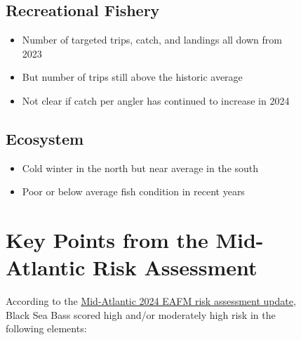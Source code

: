 \documentclass[
  10pt,
  letterpaper,
  DIV=11,
  numbers=noendperiod]{scrartcl}
\providecommand{\tightlist}{%
  \setlength{\itemsep}{0pt}\setlength{\parskip}{0pt}}\usepackage{longtable,booktabs,array}
\begin{document}
\begin{figure}
\begin{minipage}[t]{0.57\linewidth}
{\subsection{Recreational Fishery}

\begin{itemize}
\tightlist
\item
  Number of targeted trips, catch, and landings all down from 2023
\item
  But number of trips still above the historic average
\item
  Not clear if catch per angler has continued to increase in 2024
\end{itemize}

\subsection{Ecosystem}

\begin{itemize}
\tightlist
\item
  Cold winter in the north but near average in the south
\item
  Poor or below average fish condition in recent years
\end{itemize}

}

\end{minipage}%
\newline
\begin{minipage}[t]{\linewidth}

{\centering 

\vspace{0.5cm}
\section{Key Points from the Mid-Atlantic Risk Assessment}

}

\end{minipage}%
\newline
\begin{minipage}[t]{0.57\linewidth}

{\centering 

\vspace{-3cm}

\raggedright

According to the
\href{https://static1.squarespace.com/static/511cdc7fe4b00307a2628ac6/t/6747560a3cf66936045e5547/1732728332670/05_EAFM+Risk+Assessment.pdf}{Mid-Atlantic
2024 EAFM risk assessment update}, Black Sea Bass scored high and/or
moderately high risk in the following elements:

}
\end{minipage}
\end{figure}
\end{document}
